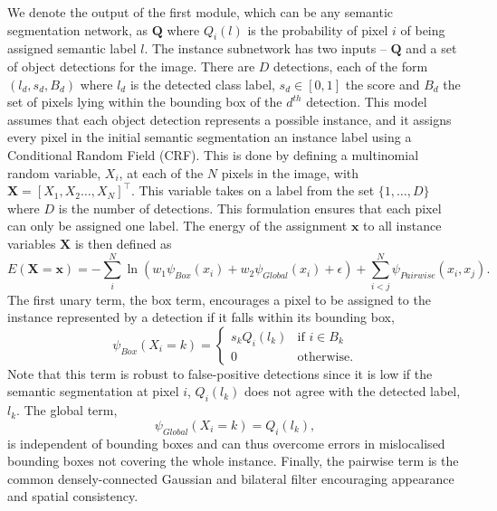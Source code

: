 \documentclass[runningheads]{llncs}
\begin{document}
We denote the output of the first module, which can be any semantic segmentation network, as $\mathbf{Q}$ where $Q_i(l)$ is the probability of pixel $i$ of being assigned semantic label $l$.
The instance subnetwork has two inputs -- $\mathbf{Q}$ and a set of object detections for the image.
There are $D$ detections, each of the form $\left(l_d, s_d, B_d \right)$ where $l_d$ is the detected class label, $s_d \in [0,1]$ the score and $B_d$ the set of pixels lying within the bounding box of the $d^{th}$ detection.
This model assumes that each object detection represents a possible instance, and it assigns every pixel in the initial semantic segmentation an instance label using a Conditional Random Field (CRF).
This is done by defining a multinomial random variable, $X_i$, at each of the $N$ pixels in the image, with $\mathbf{X} = [X_1, X_2 \ldots , X_N]^{\top}$.
This variable takes on a label from the set $\{1,\ldots,D\}$ where $D$ is the number of detections.
This formulation ensures that each pixel can only be assigned one label.
The energy of the assignment $\mathbf{x}$ to all instance variables $\mathbf{X}$ is then defined as
\begin{equation}
E(\mathbf{X} = \mathbf{x}) = -\sum_{i}^{N} \ln \left(w_1 \psi_{Box}(x_i) + w_2 \psi_{Global}(x_i) + \epsilon \right) + \sum_{i < j}^{N}\psi_{Pairwise}(x_i, x_j).
\end{equation}
The first unary term, the box term, encourages a pixel to be assigned to the instance represented by a detection if it falls within its bounding box,
\begin{equation}
\psi_{Box}(X_i = k) = 
	\begin{cases}
	s_k Q_i(l_k)  & \text{if } i \in B_k\\
	0             & \text{otherwise}.
	\end{cases}
\end{equation}
Note that this term is robust to false-positive detections \cite{arnab_cvpr_2017} since it is low if the semantic segmentation at pixel $i$, $Q_i(l_k)$ does not agree with the detected label, $l_k$. The global term,
\begin{equation}
\psi_{Global}(X_i = k) = Q_{i}(l_k),
\end{equation}
is independent of bounding boxes and can thus overcome errors in mislocalised bounding boxes not covering the whole instance.
Finally, the pairwise term is the common densely-connected Gaussian and bilateral filter \cite{krahenbuhl_2011} encouraging appearance and spatial consistency.
\end{document}
